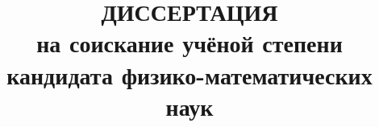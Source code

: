 \documentclass[%
candidate,      %
natbib,         %
subf,           %
href,           %
colorlinks=true %
,facsimile     %
]{disser}
\begin{document}
\theoremstyle{plain}
\newtheorem{Theorem}{Теорема}
\newtheorem{Def}{Определение}
\newtheorem{Pred}{Утверждение}
\newtheorem{Corollary}{Следствие}
\newenvironment{Proof}%
{
	\par\noindent{\bf Доказательство.}
}%
{
	\hfill$\scriptstyle\blacksquare$
}

\algrenewcommand{}
\algrenewcommand{}
\algrenewcommand{}
\algrenewcommand{}
\algrenewcommand{}
\algrenewcommand{}
\algrenewcommand{}
\algrenewcommand{}
\algrenewcommand\algorithmicdo{}
\renewcommand{\algorithmiccomment}[1]{{\quad\sl // #1}}





\title{ДИССЕРТАЦИЯ\\
на соискание учёной степени\\
кандидата физико-математических наук}

\maketitle

\tableofcontents













\listoffigures

\appendix


\end{document}
